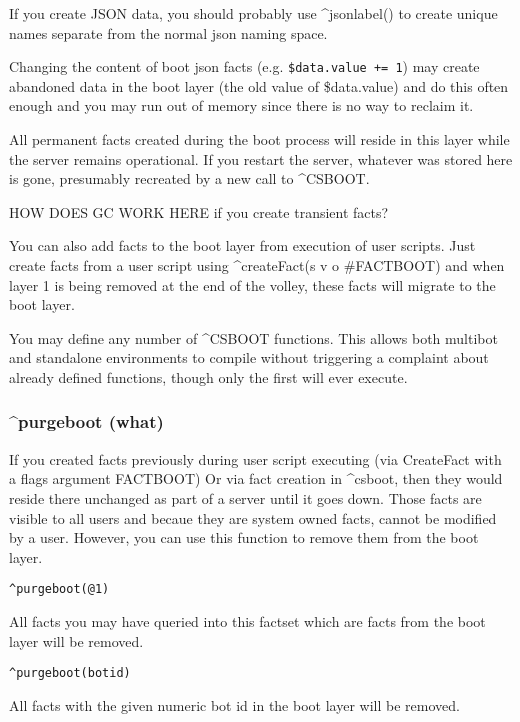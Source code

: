 \documentclass[]{article}
\begin{document}
If you create JSON data, you should probably use \^{}jsonlabel() to
create unique names separate from the normal json naming space.

Changing the content of boot json facts (e.g.
\texttt{\$data.value\ +=\ 1}) may create abandoned data in the boot
layer (the old value of \$data.value) and do this often enough and you
may run out of memory since there is no way to reclaim it.

All permanent facts created during the boot process will reside in this
layer while the server remains operational. If you restart the server,
whatever was stored here is gone, presumably recreated by a new call to
\^{}CSBOOT.

HOW DOES GC WORK HERE if you create transient facts?

You can also add facts to the boot layer from execution of user scripts.
Just create facts from a user script using \^{}createFact(s v o
\#FACTBOOT) and when layer 1 is being removed at the end of the volley,
these facts will migrate to the boot layer.

You may define any number of \^{}CSBOOT functions. This allows both
multibot and standalone environments to compile without triggering a
complaint about already defined functions, though only the first will
ever execute.

\subsubsection{\^{}purgeboot (what)}\label{purgeboot-what}

If you created facts previously during user script executing (via
CreateFact with a flags argument FACTBOOT) Or via fact creation in
\^{}csboot, then they would reside there unchanged as part of a server
until it goes down. Those facts are visible to all users and becaue they
are system owned facts, cannot be modified by a user. However, you can
use this function to remove them from the boot layer.

\begin{verbatim}
^purgeboot(@1)
\end{verbatim}

All facts you may have queried into this factset which are facts from
the boot layer will be removed.

\begin{verbatim}
^purgeboot(botid)
\end{verbatim}

All facts with the given numeric bot id in the boot layer will be
removed.
\end{document}
